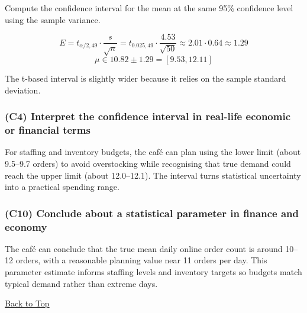 Compute the confidence interval for the mean at the same 95\% confidence level using the sample variance.

\[
E = t_{\alpha/2,49} \cdot \frac{s}{\sqrt{n}} = t_{0.025,49} \cdot \frac{4.53}{\sqrt{50}} \approx 2.01 \cdot 0.64 \approx 1.29
\]
\[
\mu \in 10.82 \pm 1.29 = [9.53, 12.11]
\]

The t-based interval is slightly wider because it relies on the sample standard deviation.

\subsubsection{(C4) Interpret the confidence interval in real-life economic or financial terms}\label{subsubsec:interval-example1-2-c4}

For staffing and inventory budgets, the café can plan using the lower limit (about 9.5--9.7 orders) to avoid overstocking while recognising that true demand could reach the upper limit (about 12.0--12.1). The interval turns statistical uncertainty into a practical spending range.

\subsubsection{(C10) Conclude about a statistical parameter in finance and economy}\label{subsubsec:interval-example1-2-c10}

The café can conclude that the true mean daily online order count is around 10--12 orders, with a reasonable planning value near 11 orders per day. This parameter estimate informs staffing levels and inventory targets so budgets match typical demand rather than extreme days.

\vspace{6pt}
\noindent\hyperref[table-of-contents]{Back to Top}
